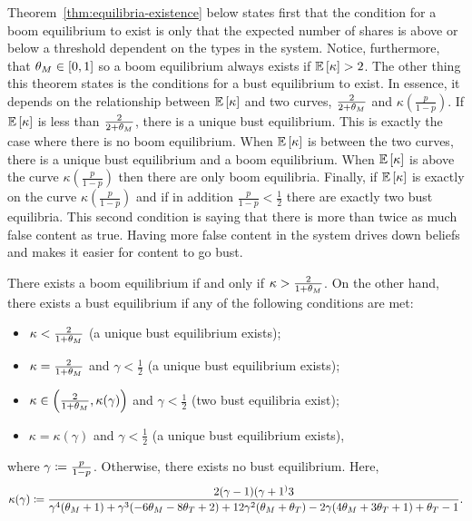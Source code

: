 Theorem~\ref{thm:equilibria-existence} below states first that the condition for a boom equilibrium to exist is only that the expected number of shares is above or below a threshold dependent on the types in the system. Notice, furthermore, that $\theta_M \in [0,1]$ so a boom equilibrium always exists if $\mathbb{E}\left[ \kappa\right] > 2$. The other thing this theorem states is the conditions for a bust equilibrium to exist. In essence, it depends on the relationship between $\mathbb{E}\left[ \kappa\right]$ and two curves, $\frac{2}{2+\theta_M}$ and $\kappa(\frac{p}{1-p})$. If $\mathbb{E}\left[ \kappa\right]$ is less than $\frac{2}{2+\theta_M}$, there is a unique bust equilibrium. This is exactly the case where there is no boom equilibrium. When $\mathbb{E}\left[ \kappa\right]$ is between the two curves, there is a unique bust equilibrium and a boom equilibrium. When $\mathbb{E}\left[ \kappa\right]$ is above the curve $\kappa(\frac{p}{1-p})$ then there are only boom equilibria. Finally, if $\mathbb{E}\left[ \kappa\right]$ is exactly  on the curve $\kappa(\frac{p}{1-p})$ and if in addition $\frac{p}{1-p} < \frac{1}{2}$ there are exactly two bust equilibria. This second condition is saying that there is more than twice as much false content as true. Having more false content in the system drives down beliefs and makes it easier for content to go bust. 
\begin{theorem}\label{thm:equilibria-existence}
    There exists a  boom equilibrium if and only if $\kappa >  \frac{2}{1+\theta_M}$. On the other hand, there exists a bust equilibrium if any of the following conditions are met: 
    \begin{itemize}
        \item $\kappa < \frac{2}{1+\theta_M}$ (a unique bust equilibrium exists); 
        \item $\kappa = \frac{2}{1+\theta_M}$ and $\gamma < \frac{1}{2}$ (a unique bust equilibrium exists);  
        \item $\kappa \in \left(\frac{2}{1+\theta_M} , \kappa(\gamma) \right)$ and $\gamma < \frac{1}{2}$ (two bust equilibria exist);
        \item $\kappa = \kappa(\gamma)$ and $\gamma < \frac{1}{2}$ (a unique bust equilibrium exists),
    \end{itemize}
    where $\gamma \coloneqq \frac{p}{1-p}$. Otherwise, there exists no bust equilibrium. Here, \[\kappa(\gamma) \coloneqq \frac{2 (\gamma-1) (\gamma+1^)3}{\gamma^4 (\theta_M+1)+\gamma^3 (-6 \theta_M-8 \theta_T+2)+12 \gamma^2 (\theta_M+\theta_T)-2 \gamma (4 \theta_M+3 \theta_T+1)+\theta_T-1}.\]
\end{theorem}


